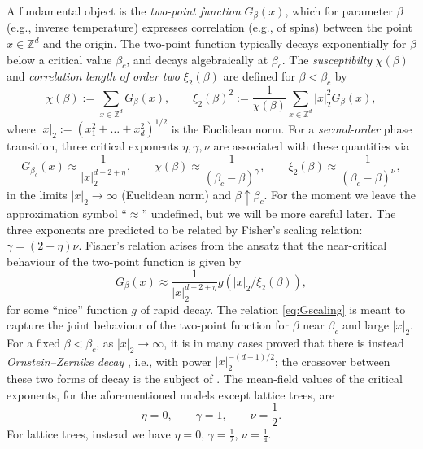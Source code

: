 \documentclass[11pt,a4paper]{article}
\numberwithin{equation}{section}
\theoremstyle{plain}
\theoremstyle{definition}
\newcommand\1{\mathds{1}}
\begin{document}
A fundamental object is the \emph{two-point function} $G_\beta(x)$, which for parameter
$\beta$ (e.g., inverse temperature) expresses correlation (e.g., of spins) between
the point $x\in\mathbb Z^d$ and the origin.
The two-point function typically decays exponentially for $\beta$ below
a critical value $\beta_c$, and decays algebraically at $\beta_c$.
The \emph{susceptibilty} $\chi(\beta)$ and \emph{correlation length of order two}
$\xi_2(\beta)$
are defined for $\beta< \beta_c$ by
\begin{equation}
\label{eq:xiG}
   \chi(\beta) := \sum_{x\in\mathbb Z^d} G_\beta(x),
     \qquad
    \xi_2(\beta)^2 := \frac{1}{\chi(\beta)}\sum_{x\in\mathbb Z^d} |x|_2^2 G_\beta(x),
\end{equation}
where $|x|_2:=(x_1^2+\ldots+x_d^2)^{1/2}$ is the  Euclidean norm.
For a \emph{second-order} phase transition,
three critical exponents $\eta,\gamma,\nu$ are associated with these quantities
via
\begin{equation}
    G_{\beta_c}(x) \approx \frac{1}{|x|_2^{d-2+\eta}},
    \qquad
    \chi(\beta) \approx \frac{1}{(\beta_c-\beta)^\gamma},
    \qquad
    \xi_2(\beta) \approx \frac{1}{(\beta_c-\beta)^\nu},
\end{equation}
in the limits $|x|_2 \to \infty$ (Euclidean norm) and $\beta \uparrow \beta_c$.
For the moment we leave the approximation symbol ``$\approx$'' undefined,
but we will be more careful later.  The three exponents are predicted to be
related by Fisher's scaling relation: $\gamma=(2-\eta)\nu$.  Fisher's relation arises from
the ansatz that the near-critical behaviour of the two-point function is
given by
\begin{equation}
\label{eq:Gscaling}
    G_\beta(x) \approx \frac{1}{|x|_2^{d-2+\eta}}g(|x|_2/\xi_2(\beta)),
\end{equation}
for some ``nice'' function $g$ of rapid decay.
The relation \eqref{eq:Gscaling} is
meant to capture the joint behaviour of the two-point function for $\beta$ near
$\beta_c$ and large $|x|_2$. For a fixed $\beta<\beta_c$, as $|x|_2\to\infty$,
it is in many cases proved that there is instead
\emph{Ornstein--Zernike decay} \cite{OZ14,Zern16}, i.e., with power $|x|_2^{-(d-1)/2}$; the crossover
between these two forms of decay is the subject of \cite{MS22,LS26OZ}.
The mean-field values of the critical exponents, for the aforementioned
models except lattice trees, are
\begin{equation}
    \eta=0, \qquad \gamma =1, \qquad \nu = \frac 12.
\end{equation}
For lattice trees, instead we have $\eta=0$, $\gamma =\frac 12$, $\nu = \frac 14$.
\end{document}
